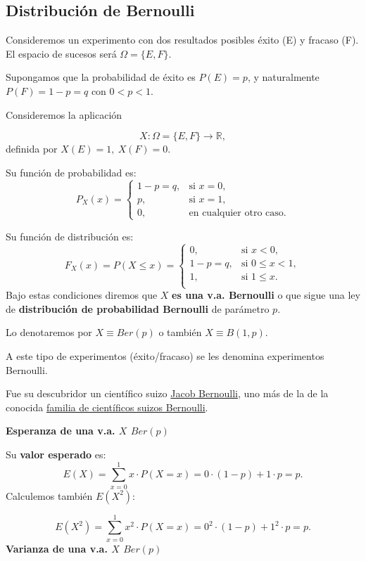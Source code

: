 \documentclass[]{book}
\begin{document}
\hypertarget{distribuciuxf3n-de-bernoulli}{%
\subsection{Distribución de Bernoulli}\label{distribuciuxf3n-de-bernoulli}}

Consideremos un experimento con dos resultados posibles éxito (E) y
fracaso (F). El espacio de sucesos será \(\Omega=\{E,F\}\).

Supongamos que la probabilidad de éxito es \(P(E)=p\), y naturalmente \(P(F)=1-p=q\) con \(0<p<1\).

Consideremos la aplicación

\[
X:\Omega=\{E,F\}\to \mathbb{R},
\]
definida por \(X(E)=1,\ X(F)=0.\)

Su función de probabilidad es:
\[
P_{X}(x)=
\left\{
\begin{array}{ll} 1-p=q, & \mbox{si } x=0,\\
p, & \mbox{si } x=1,\\
0, & \mbox{en cualquier otro caso.}
\end{array}
\right.
\]

Su función de distribución es:
\[
F_{X}(x)=P(X\leq x)=
\left\{
\begin{array}{ll} 
0, & \mbox{si } x<0,\\
1-p=q, & \mbox{si } 0\leq x <1,\\
1, & \mbox{si } 1\leq x. \\
\end{array}
\right.
\]
Bajo estas condiciones diremos que \(X\) \textbf{es una v.a. Bernoulli} o que sigue una ley de \textbf{distribución de probabilidad Bernoulli} de parámetro \(p\).

Lo denotaremos por \(X\equiv Ber(p)\) o también \(X\equiv B(1,p).\)

A este tipo de experimentos (éxito/fracaso) se les denomina experimentos Bernoulli.

Fue su descubridor un científico suizo \href{https://es.wikipedia.org/wiki/Jakob_Bernoulli}{Jacob Bernoulli}, uno más de la de la conocida \href{https://es.wikipedia.org/wiki/Familia_Bernoulli}{familia de científicos suizos Bernoulli}.

\textbf{Esperanza de una v.a. \(X\) \(Ber(p)\)}

Su \textbf{valor esperado} es:
\[E(X)=\displaystyle\sum_{x=0}^1 x\cdot P(X=x)= 0\cdot(1-p)+1\cdot p=p.\]
Calculemos también \(E(X^2)\):

\[E(X^2)=\displaystyle\sum_{x=0}^1 x^2\cdot P(X=x)= 0^2\cdot(1-p)+1^2\cdot p=p.\]
\textbf{Varianza de una v.a. \(X\) \(Ber(p)\)}
\end{document}
